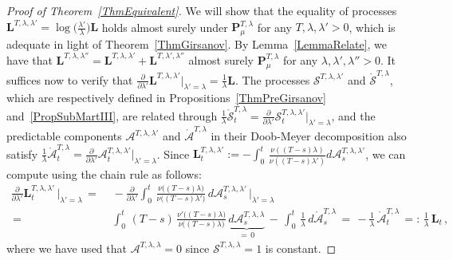 \documentclass[10pt]{article}
\numberwithin{equation}{section}
\theoremstyle{definition}
\begin{document}
\begin{proof}[Proof of Theorem~\ref{ThmEquivalent}] We will show that the  equality of processes $\mathbf{L}^{T,\lambda,\lambda'}=\log\big(\frac{\lambda'}{\lambda} \big) \mathbf{L}$ holds almost surely under $ \mathbf{P}_{\mu}^{T,\lambda}$ for any $T,\lambda,\lambda'>0$, which is adequate  in light of Theorem~\ref{ThmGirsanov}. By Lemma~\ref{LemmaRelate}, we have that
$\mathbf{L}^{T,\lambda,\lambda''}=\mathbf{L}^{T,\lambda,\lambda'}+\mathbf{L}^{T,\lambda',\lambda''}$  almost surely $\mathbf{P}^{T,\lambda}_{\mu} $  for any $ \lambda,\lambda',\lambda''>0$.  It suffices now to verify that $ \frac{\partial}{\partial \lambda'}\mathbf{L}^{T,\lambda,\lambda'}|_{\lambda'=\lambda}=\frac{1}{\lambda}\mathbf{L}$.  The processes   $  \mathcal{S}^{T,\lambda,\lambda'}$ and $\mathcal{\mathring{S}}^{T,\lambda}$, which are respectively defined  in Propositions~\ref{ThmPreGirsanov} and~\ref{PropSubMartIII},  are related through  $ \frac{1}{\lambda}\mathcal{\mathring{S}}^{T,\lambda}_t=   \frac{\partial}{\partial \lambda'}\mathcal{S}^{T,\lambda,\lambda'}_t|_{\lambda'=\lambda} $, and  the predictable components  $  \mathcal{A}^{T,\lambda,\lambda'}$ and $\mathcal{\mathring{A}}^{T,\lambda}$ in their Doob-Meyer decomposition also satisfy  $ \frac{1}{\lambda}\mathcal{\mathring{A}}^{T,\lambda}_t=  \frac{\partial}{\partial \lambda'}\mathcal{A}^{T,\lambda,\lambda'}_t\big|_{\lambda'=\lambda} $.   Since $\mathbf{L}_{t}^{T,\lambda,\lambda'}:=-\int_0^{t} \,\frac{ \nu((T-s)\lambda)  }{ \nu((T-s)\lambda')  }  d\mathcal{A}_s^{T,\lambda,\lambda'}$, we can compute   using the chain rule as follows:
\begin{align*}
    \frac{\partial}{\partial \lambda'} \mathbf{L}_{t}^{T,\lambda,\lambda'}\,\bigg|_{\lambda'=\lambda}\,=\,&\,-  \frac{\partial}{\partial \lambda'}\int_0^{t} \,\frac{ \nu\big((T-s)\lambda\big)  }{ \nu\big((T-s)\lambda'\big)  } \, d\mathcal{A}_s^{T,\lambda,\lambda'} \, \bigg|_{\lambda'=\lambda} \nonumber    \\ \,=\,&\,\int_0^{t} \,(T-s)\,\frac{\nu'\big((T-s)\lambda\big)  }{ \nu\big((T-s)\lambda\big)  } \, \underbrace{d\mathcal{A}_s^{T,\lambda,\lambda}}_{=\,0} \,-\,\int_0^{t} \, \frac{1}{\lambda}\,d\mathcal{\mathring{A}}_s^{T,\lambda}    \,=\,-\frac{1}{\lambda}\,\mathcal{\mathring{A}}_t^{T,\lambda}\,=:\,\frac{1}{\lambda}\,\mathbf{L}_t\,, \nonumber
\end{align*}
where we have used that $  \mathcal{A}^{T,\lambda,\lambda}=0$ since    $  \mathcal{S}^{T,\lambda,\lambda}=1$ is constant.
\end{proof}
\end{document}
